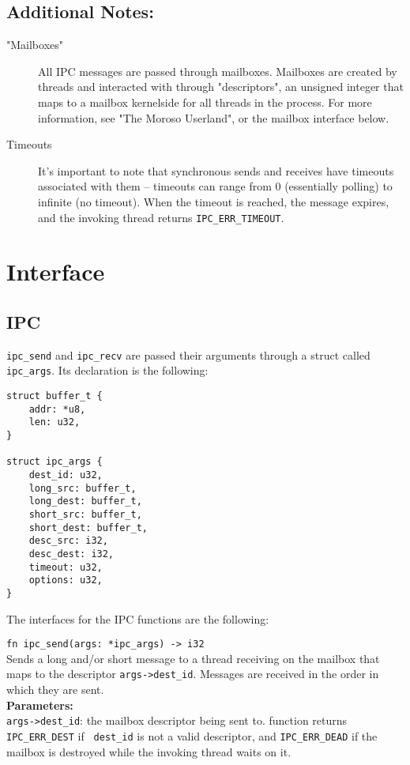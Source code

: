 \documentclass{article}
\begin{document}
\subsection{Additional Notes:}
\begin{description}
\item["Mailboxes"] All IPC messages are passed through mailboxes.  Mailboxes are created by threads and interacted with through "descriptors", an unsigned integer that maps to a mailbox kernelside for all threads in the process.  For more information, see "The Moroso Userland", or the mailbox interface below.
\item[Timeouts] It's important to note that synchronous sends and receives have timeouts associated with them -- timeouts can range from 0 (essentially polling) to infinite (no timeout).  When the timeout is reached, the message expires, and the invoking thread returns \verb|IPC_ERR_TIMEOUT|.  
\end{description}
\section{Interface}

\subsection{IPC}
\verb|ipc_send| and \verb|ipc_recv| are passed their arguments through a struct called \verb|ipc_args|.  Its declaration is the following:

\begin{verbatim}
struct buffer_t {
    addr: *u8,
    len: u32,
}

struct ipc_args {
    dest_id: u32,
    long_src: buffer_t,
    long_dest: buffer_t, 
    short_src: buffer_t,
    short_dest: buffer_t,
    desc_src: i32,
    desc_dest: i32,
    timeout: u32,
    options: u32,
}
\end{verbatim}

The interfaces for the IPC functions are the following:

\verb|fn ipc_send(args: *ipc_args) -> i32|\\

Sends a long and/or short message to a thread receiving on the mailbox that maps to the  descriptor \verb|args->dest_id|.  Messages are received in the order in which they are sent.\\

\textbf{Parameters:}\\
   \verb|args->dest_id|: the mailbox descriptor being sent to.  function returns \verb|IPC_ERR_DEST| if
  \verb| dest_id| is not a valid descriptor, and \verb|IPC_ERR_DEAD| if the mailbox is
   destroyed while the invoking thread waits on it. \\
 
\end{document}

